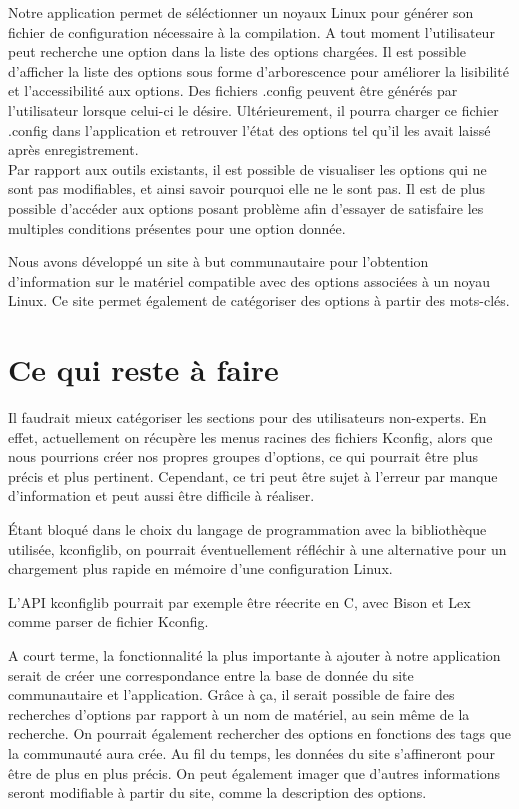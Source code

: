 \documentclass[17pts]{report}
\begin{document}
    Notre application permet de séléctionner un noyaux Linux pour générer son
    fichier de configuration nécessaire à la compilation. A tout moment
    l'utilisateur peut recherche une option dans la liste des options chargées.
    Il est possible d'afficher la liste des options sous forme d'arborescence
    pour améliorer la lisibilité et l'accessibilité aux options. Des fichiers
    .config peuvent être générés par l'utilisateur lorsque celui-ci le désire.
    Ultérieurement, il pourra charger ce fichier .config dans l'application et
    retrouver l'état des options tel qu'il les avait laissé après
    enregistrement.\\

    Par rapport aux outils existants, il est possible de visualiser les options
    qui ne sont pas modifiables, et ainsi savoir pourquoi elle ne le sont pas.
    Il est de plus possible d'accéder aux options posant problème afin
    d'essayer de satisfaire les multiples conditions présentes pour une option
    donnée.

    Nous avons développé un site à but communautaire pour l'obtention
    d'information sur le matériel compatible avec des options associées à un
    noyau Linux. Ce site permet également de catégoriser des options à partir
    des mots-clés.

    \section{Ce qui reste à faire}
    \label{sec:Ce qui reste à faire}
    Il faudrait mieux catégoriser les sections pour des utilisateurs
    non-experts.  En effet, actuellement on récupère les menus racines des
    fichiers Kconfig, alors que nous pourrions créer nos propres groupes
    d'options, ce qui pourrait être plus précis et plus pertinent. Cependant,
    ce tri peut être sujet à l'erreur par manque d'information et peut aussi
    être difficile à réaliser.

    Étant bloqué dans le choix du langage de programmation avec la bibliothèque
    utilisée, kconfiglib, on pourrait éventuellement réfléchir à une
    alternative pour un chargement plus rapide en mémoire d'une configuration
    Linux.

    L'API kconfiglib pourrait par exemple être réecrite en C, avec Bison et Lex
    comme parser de fichier Kconfig.

    A court terme, la fonctionnalité la plus importante à ajouter à notre
    application serait de créer une correspondance entre la base de donnée du
    site communautaire et l'application. Grâce à ça, il serait possible de
    faire des recherches d'options par rapport à un nom de matériel, au sein
    même de la recherche. On pourrait également rechercher des options en
    fonctions des tags que la communauté aura crée. Au fil du temps, les
    données du site s'affineront pour être de plus en plus précis. On peut
    également imager que d'autres informations seront modifiable à partir du
    site, comme la description des options.
\end{document}
